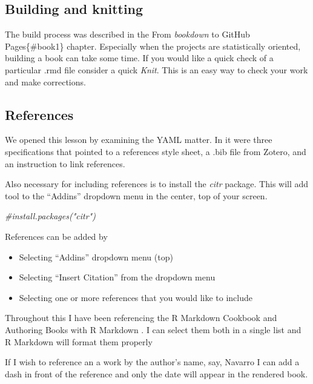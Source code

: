 \documentclass[
]{book}
\newenvironment{Shaded}{\begin{snugshade}}{\end{snugshade}}
\newcommand{\CommentTok}[1]{\textcolor[rgb]{0.56,0.35,0.01}{\textit{#1}}}
\providecommand{\tightlist}{%
  \setlength{\itemsep}{0pt}\setlength{\parskip}{0pt}}
\begin{document}
\hypertarget{building-and-knitting}{%
\subsection{Building and knitting}\label{building-and-knitting}}

The build process was described in the From \emph{bookdown} to GitHub Pages\{\#book1\} chapter. Especially when the projects are statistically oriented, building a book can take some time. If you would like a quick check of a particular .rmd file consider a quick \emph{Knit}. This is an easy way to check your work and make corrections.

\hypertarget{references}{%
\subsection{References}\label{references}}

We opened this lesson by examining the YAML matter. In it were three specifications that pointed to a references style sheet, a .bib file from Zotero, and an instruction to link references.

Also necessary for including references is to install the \emph{citr} package. This will add tool to the ``Addins'' dropdown menu in the center, top of your screen.

\begin{Shaded}
\begin{Highlighting}[]
\CommentTok{\#install.packages("citr")}
\end{Highlighting}
\end{Shaded}

References can be added by

\begin{itemize}
\tightlist
\item
  Selecting ``Addins'' dropdown menu (top)
\item
  Selecting ``Insert Citation'' from the dropdown menu
\item
  Selecting one or more references that you would like to include
\end{itemize}

Throughout this I have been referencing the R Markdown Cookbook and Authoring Books with R Markdown
\citep{xie_r_2021, xie_authoring_2021}. I can select them both in a single list and R Markdown will format them properly

If I wish to reference an a work by the author's name, say, Navarro \citeyearpar{navarro_book_2020} I can add a dash in front of the reference and only the date will appear in the rendered book.
\end{document}
